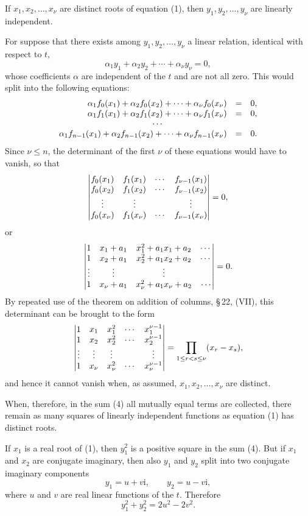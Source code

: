 \documentclass[11pt]{article}
\providecommand{\ii}{\mathrm{i}}
\begin{document}
If $x_1,x_2,\ldots,x_\nu$ are distinct roots of equation (1), then $y_1,y_2,\ldots,y_\nu$ are linearly independent.

For suppose that there exists among $y_1,y_2,\ldots,y_\nu$ a linear relation, identical with respect to $t$,
\[
        \alpha_1y_1+\alpha_2y_2+\cdots+\alpha_\nu y_\nu=0,
\]
whose coefficients $\alpha$ are independent of the $t$ and are not all zero. This would split into the following equations:
\[
\begin{array}{rcl}
\alpha_1f_0(x_1)+\alpha_2f_0(x_2)+\cdots+\alpha_\nu f_0(x_\nu)&=&0,\cr
\alpha_1f_1(x_1)+\alpha_2f_1(x_2)+\cdots+\alpha_\nu f_1(x_\nu)&=&0,\cr
\multicolumn{3}{c}{\cdots}\cr
\alpha_1f_{n-1}(x_1)+\alpha_2f_{n-1}(x_2)+\cdots+\alpha_\nu f_{n-1}(x_\nu)&=&0.
\end{array}
\]
Since $\nu\leq n$, the determinant of the first $\nu$ of these equations would have to vanish, so that
\[
\begin{vmatrix}
 f_0(x_1)&f_1(x_1)&\cdots&f_{\nu-1}(x_1)\cr
 f_0(x_2)&f_1(x_2)&\cdots&f_{\nu-1}(x_2)\cr
 \vdots&\vdots&&\vdots\cr
 f_0(x_\nu)&f_1(x_\nu)&\cdots&f_{\nu-1}(x_\nu)
\end{vmatrix}=0,
\]
or
\[
\begin{vmatrix}
 1&x_1+a_1&x_1^2+a_1x_1+a_2&\cdots\cr
 1&x_2+a_1&x_2^2+a_1x_2+a_2&\cdots\cr
 \vdots&\vdots&\vdots&\cr
 1&x_\nu+a_1&x_\nu^2+a_1x_\nu+a_2&\cdots
\end{vmatrix}=0.
\]
By repeated use of the theorem on addition of columns, \S\,22, (VII), this determinant can be brought to the form
\[
\begin{vmatrix}
1&x_1&x_1^2&\cdots&x_1^{\nu-1}\cr
1&x_2&x_2^2&\cdots&x_2^{\nu-1}\cr
\vdots&\vdots&\vdots&&\vdots\cr
1&x_\nu&x_\nu^2&\cdots&x_\nu^{\nu-1}
\end{vmatrix}
=\prod_{1\leq r<s\leq \nu}(x_r-x_s),
\]
and hence it cannot vanish when, as assumed, $x_1,x_2,\ldots,x_\nu$ are distinct.

When, therefore, in the sum (4) all mutually equal terms are collected, there remain as many squares of linearly independent functions as equation (1) has distinct roots.

If $x_1$ is a real root of (1), then $y_1^2$ is a positive square in the sum (4). But if $x_1$ and $x_2$ are conjugate imaginary, then also $y_1$ and $y_2$ split into two conjugate imaginary components
\[
        y_1=u+v\ii,
        \qquad
        y_2=u-v\ii,
\]
where $u$ and $v$ are real linear functions of the $t$. Therefore
\[
        y_1^2+y_2^2=2u^2-2v^2.
\]
\end{document}
